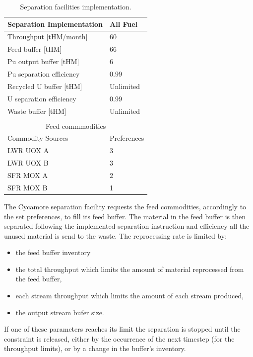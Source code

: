 \documentclass[12pt]{article}
\begin{document}
\begin{table}[h!]
    \centering
    \begin{tabular}{ll}
    \hline
    Separation Implementation  &  All Fuel   \\
    \hline
    Throughput [tHM/month]     &  60         \\
    Feed buffer [tHM]          &  66         \\
    Pu output buffer  [tHM]    &  6          \\
    Pu separation efficiency   &  0.99       \\
    Recycled U buffer [tHM]    &  Unlimited  \\
    U separation efficiency    &  0.99       \\
    Waste buffer [tHM]         &  Unlimited  \\ 
                                             \\
    \multicolumn{2}{c}{Feed commmodities}    \\
    \hline
    Commodity Sources         &  Preferences \\
    LWR UOX A                 &  3           \\
    LWR UOX B                 &  3           \\
    SFR MOX A                 &  2           \\
    SFR MOX B                 &  1           \\ %
    \hline
    \end{tabular}
    \caption{Separation facilities implementation.}
    \label{tab:fuelfab_2}
\end{table}

The Cycamore separation facility requests the feed commodities, accordingly to the
set preferences, to fill its feed buffer. The material in the feed buffer is then
separated following the implemented separation instruction and efficiency all the
unused material is send to the waste. The reprocessing rate is limited by:

\begin{itemize}

  \item the feed buffer inventory
  \item the total throughput which limits the amount of material reprocessed from
    the feed buffer,
  \item each stream throughput which limits the amount of each stream produced,
  \item the output stream bufer size.

\end{itemize}
If one of these parameters reaches its limit the separation is stopped until the
constraint is released, either by the occurrence of the next timestep (for the
throughput limits), or by a change in the buffer's inventory. 
\end{document}
